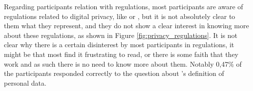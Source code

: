 

Regarding participants relation with regulations, most participants are
aware of regulations related to digital privacy, like \hyperlink{\acronym}{\acronym} or \hyperlink{\acronym}{\acronym}, but
it is not absolutely clear to them what they represent, and they do not
show a clear interest in knowing more about these regulations, as shown in Figure \ref{fig:privacy_regulations}. It is not
clear why there is a certain disinterest by most participants in regulations,
it might be that most find it frustrating to read, or there is some
faith that they work and as such there is no need to know more about them.
Notably 0,47\% of the participants responded correctly to the question
about \hyperlink{\acronym}{\acronym}'s definition of personal data.

